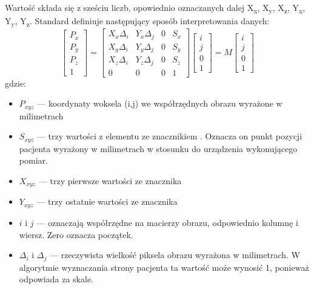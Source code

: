 \par
Wartość  składa się z sześciu liczb, opowiednio oznaczanych dalej X\textsubscript{x}, X\textsubscript{y}, X\textsubscript{z}, Y\textsubscript{x}, Y\textsubscript{y}, Y\textsubscript{z}.
Standard \DICOM definiuje następujący sposób interpretowania danych:
\[
    \begin{bmatrix}
        P_x \\ P_y \\ P_z \\ 1
    \end{bmatrix}
    =
    \begin{bmatrix}
        X_x\Delta_i & Y_x\Delta_j & 0 & S_x \\
        X_y\Delta_i & Y_y\Delta_j & 0 & S_y \\
        X_z\Delta_i & Y_z\Delta_j & 0 & S_z \\
        0           & 0           & 0 & 1
    \end{bmatrix}
    \begin{bmatrix}
        i \\ j \\ 0 \\ 1
    \end{bmatrix}
    =
    M
    \begin{bmatrix}
        i \\ j \\ 0 \\ 1
    \end{bmatrix}
\]
gdzie:
\begin{itemize}
    \item $P_{xyz}$ --- koordynaty woksela (i,j) we współrzędnych obrazu wyrażone w milimetrach
    \item $S_{xyz}$ --- trzy wartości z elementu ze znacznikiem . Oznacza on punkt pozycji pacjenta wyrażony w milimetrach w stosunku do urządzenia wykonującego pomiar.
    \item $X_{xyz}$ --- trzy pierwsze wartości ze znacznika 
    \item $Y_{xyz}$ --- trzy ostatnie wartości ze znacznika 
    \item $i$ i $j$ --- oznaczają współrzędne na macierzy obrazu, odpowiednio kolumnę i wiersz. Zero oznacza początek.
    \item $\Delta_i$ i $\Delta_j$ --- rzeczywista wielkość piksela obrazu wyrażona w milimetrach.
          W algorytmie wyznaczania strony pacjenta ta wartość może wynosić 1, ponieważ odpowiada za skale.
\end{itemize}

